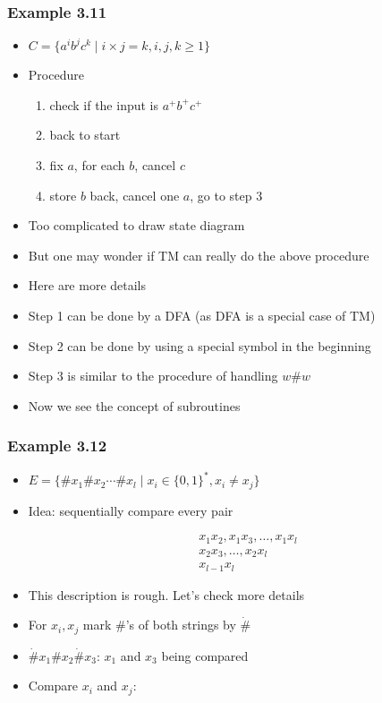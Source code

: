 \begin{frame}[allowframebreaks] \frametitle{Example 3.11}
  \begin{itemize}
\item $C=\{a^i b^j c^k\mid i\times j=k, i,j,k \geq 1\}$
\item Procedure
  \begin{enumerate}
  \item check if the input is $a^+ b^+ c^+$
  \item back to start
  \item fix $a$, for each $b$, cancel $c$
  \item store $b$ back, cancel one $a$, go to step 3
  \end{enumerate}
\item Too complicated to draw state diagram
\item But one may wonder if TM can really do the above procedure
\item Here are more details
\item Step 1 can be done by a DFA (as DFA is a special case of TM)
\item Step 2 can be done by using a special symbol in the beginning
\item Step 3 is similar to the procedure of handling $w\#w$
\item [] Now we see the concept of subroutines
\end{itemize}\end{frame} \begin{frame}[allowframebreaks] \frametitle{Example 3.12}
  \begin{itemize}
\item $E=\{\#x_1\# x_2 \cdots \# x_l\mid x_i \in 
\{0,1\}^*, x_i \neq x_j\}$
\item Idea: sequentially compare every pair

  \begin{equation*}
    \begin{split}
& x_1 x_2, x_1 x_3, \ldots, x_1 x_l \\
& x_2 x_3, \ldots, x_2 x_l \\
& x_{l-1} x_l
\end{split}
\end{equation*}
\item This description is rough. Let's check more details

\item [] For $x_i, x_j$ mark \#'s of both strings
by $\dot{\#}$

\item [] $\dot{\#}x_1\#x_2 \dot{\#}x_3$: $x_1$ and $x_3$
being compared
\item Compare $x_i$ and $x_j$:


\end{itemize}
\end{frame}
